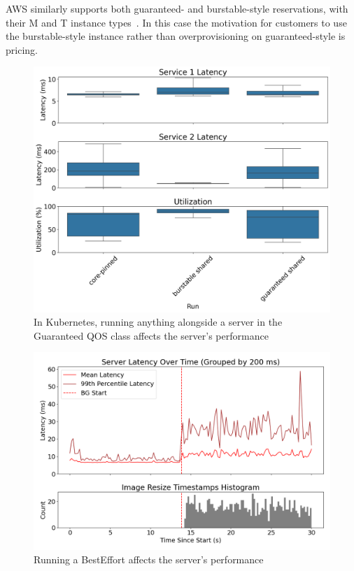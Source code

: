 AWS similarly supports both guaranteed- and burstable-style reservations, with
their M and T instance types~\cite{aws-ec2-burstable,aws-ec2-resources}. In this
case the motivation for customers to use the burstable-style instance rather
than overprovisioning on guaranteed-style is pricing.


\begin{figure}[t]
    \centering
    \includegraphics[width=\columnwidth]{graphs/kubernetes-lc-lc-cmp.png}
    \caption{In Kubernetes, running anything alongside a server in the
    Guaranteed QOS class affects the server's
    performance}\label{fig:kubernetes-qos-cmp}
\end{figure}

\begin{figure}[t]
    \centering
    \includegraphics[width=\columnwidth]{graphs/kubernetes-unedited.png}
    \caption{Running a BestEffort affects the server's
    performance}\label{fig:kubernetes-unedited}
\end{figure}

